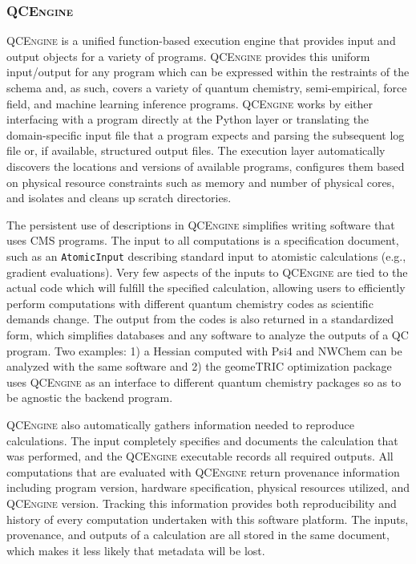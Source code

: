 \documentclass[journal=jctcce,manuscript=article]{achemso}
\newcommand{\qcskN}{QCSchema}
\newcommand{\qcngN}{QCEngine}
\newcommand{\qcsk}{{\sc{\qcskN}}\xspace}%
\newcommand{\qcng}{{\textsc{\qcngN}}\xspace}%
\begin{document}
\subsubsection{\qcng}

\qcng is a unified function-based execution engine that provides \qcsk input and output objects for a variety of programs.
\qcng provides this uniform input/output for any program which can be expressed within the restraints of the schema and, as such, covers a variety of quantum chemistry, semi-empirical, force field, and machine learning inference programs.
\qcng works by either interfacing with a program directly at the Python layer or translating the domain-specific input file that a program expects and parsing the subsequent log file or, if available, structured output files.
The execution layer automatically discovers the locations and versions of available programs, configures them based on physical resource constraints such as memory and number of physical cores, and isolates and cleans up scratch directories.

The persistent use of \qcsk descriptions in \qcng simplifies writing software that uses CMS programs.
The input to all computations is a \qcsk specification document, such as an \texttt{AtomicInput} describing standard input to atomistic calculations (e.g., gradient evaluations).
Very few aspects of the inputs to \qcng are tied to the actual code which will fulfill the specified calculation, allowing users to efficiently perform computations with different quantum chemistry codes as scientific demands change.
The output from the codes is also returned in a standardized form, which simplifies databases and any software to analyze the outputs of a QC program.
Two examples: 1) a Hessian computed with Psi4\cite{Parrish:2017:3185} and NWChem\cite{Valiev:2010:1477} can be analyzed with the same software and
2) the geomeTRIC optimization package\cite{ping2016geometric, GH20:geometric} uses \qcng as an interface to different quantum chemistry packages so as to be agnostic the backend program.

\qcng also automatically gathers information needed to reproduce calculations. 
The input \qcsk  completely specifies and documents the calculation that was performed, and the \qcng executable records all required outputs.
All computations that are evaluated with \qcng return provenance information including program version, hardware specification, physical resources utilized, and \qcng version.
Tracking this information provides both reproducibility and history of every computation undertaken with this software platform.
The inputs, provenance, and outputs of a calculation are all stored in the same document, which makes it less likely that metadata will be lost.
\end{document}
